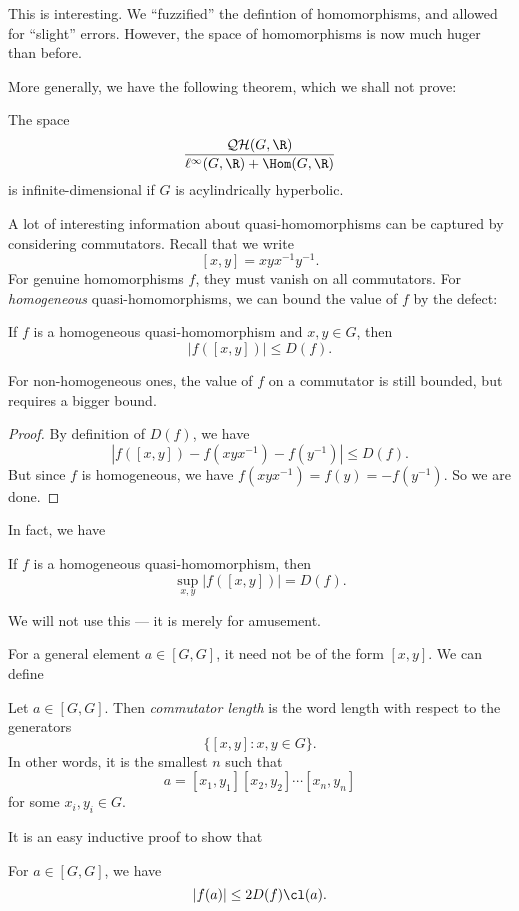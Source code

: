\documentclass[a4paper]{article}
\newcommand\QH{\mathcal{QH}}
\begin{document}
This is interesting. We ``fuzzified'' the defintion of homomorphisms, and allowed for ``slight'' errors. However, the space of homomorphisms is now much huger than before.

More generally, we have the following theorem, which we shall not prove:
\begin{thm}
  The space
  \[
    \frac{\QH(G, \R)}{\ell^\infty(G, \R) + \Hom(G, \R)}
  \]
  is infinite-dimensional if $G$ is acylindrically hyperbolic.
\end{thm}

A lot of interesting information about quasi-homomorphisms can be captured by considering commutators. Recall that we write
\[
  [x, y] = xyx^{-1}y^{-1}.
\]
For genuine homomorphisms $f$, they must vanish on all commutators. For \emph{homogeneous} quasi-homomorphisms, we can bound the value of $f$ by the defect:
\begin{lemma}
  If $f$ is a homogeneous quasi-homomorphism and $x, y \in G$, then
  \[
    |f([x, y])| \leq D(f).
  \]
\end{lemma}
For non-homogeneous ones, the value of $f$ on a commutator is still bounded, but requires a bigger bound.

\begin{proof}
  By definition of $D(f)$, we have
  \[
    |f([x, y]) - f(xyx^{-1}) - f(y^{-1})| \leq D(f).
  \]
  But since $f$ is homogeneous, we have $f(xyx^{-1}) = f(y) = - f(y^{-1})$. So we are done.
\end{proof}

In fact, we have
\begin{lemma}[Bavard, 1992]
  If $f$ is a homogeneous quasi-homomorphism, then
  \[
    \sup_{x, y} |f([x, y])| = D(f).
  \]
\end{lemma}
We will not use this --- it is merely for amusement.

For a general element $a \in [G, G]$, it need not be of the form $[x, y]$. We can define
\begin{defi}
  Let $a \in [G, G]$. Then \emph{commutator length}  is the word length with respect to the generators
  \[
    \{[x, y] : x, y \in G\}.
  \]
  In other words, it is the smallest $n$ such that
  \[
    a = [x_1, y_1][x_2, y_2] \cdots [x_n, y_n]
  \]
  for some $x_i, y_i \in G$.
\end{defi}

It is an easy inductive proof to show that
\begin{lemma}
  For $a \in [G, G]$, we have
  \[
    |f(a)| \leq 2D(f) \cl(a).
  \]
\end{lemma}
\end{document}
